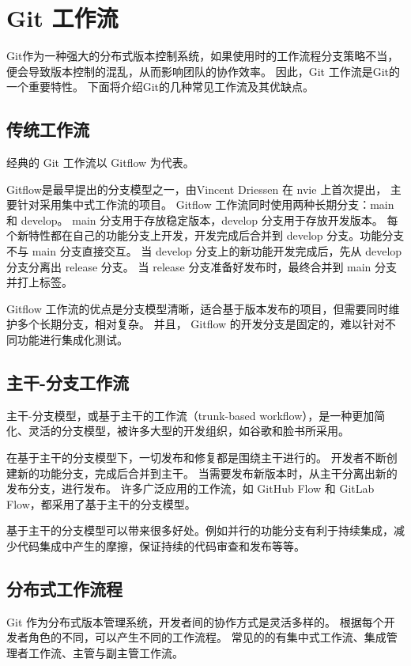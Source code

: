 \documentclass[../main.tex]{subfiles}
\begin{document}
\section{Git 工作流}

Git作为一种强大的分布式版本控制系统，如果使用时的工作流程分支策略不当，便会导致版本控制的混乱，从而影响团队的协作效率。
因此，Git 工作流是Git的一个重要特性。
下面将介绍Git的几种常见工作流及其优缺点。

\subsection{传统工作流}

经典的 Git 工作流以 Gitflow 为代表。

Gitflow是最早提出的分支模型之一，由Vincent Driessen 在 nvie 上首次提出\cite{gitflow}，
主要针对采用集中式工作流的项目。
Gitflow 工作流同时使用两种长期分支：main 和 develop。
main 分支用于存放稳定版本，develop 分支用于存放开发版本。
每个新特性都在自己的功能分支上开发，开发完成后合并到 develop 分支。功能分支不与 main 分支直接交互。
当 develop 分支上的新功能开发完成后，先从 develop 分支分离出 release 分支。
当 release 分支准备好发布时，最终合并到 main 分支并打上标签。

Gitflow 工作流的优点是分支模型清晰，适合基于版本发布的项目，但需要同时维护多个长期分支，相对复杂。
并且， Gitflow 的开发分支是固定的，难以针对不同功能进行集成化测试。

\subsection{主干-分支工作流}

主干-分支模型，或基于主干的工作流（trunk-based workflow），是一种更加简化、灵活的分支模型，被许多大型的开发组织，如谷歌和脸书所采用\cite{trunkbased}。

在基于主干的分支模型下，一切发布和修复都是围绕主干进行的。
开发者不断创建新的功能分支，完成后合并到主干。
当需要发布新版本时，从主干分离出新的发布分支，进行发布。
许多广泛应用的工作流，如 GitHub Flow 和 GitLab Flow，都采用了基于主干的分支模型。

基于主干的分支模型可以带来很多好处。例如并行的功能分支有利于持续集成，减少代码集成中产生的摩擦，保证持续的代码审查和发布等等。

\subsection{分布式工作流程}

Git 作为分布式版本管理系统，开发者间的协作方式是灵活多样的。
根据每个开发者角色的不同，可以产生不同的工作流程。
常见的的有集中式工作流、集成管理者工作流、主管与副主管工作流。
\end{document}
